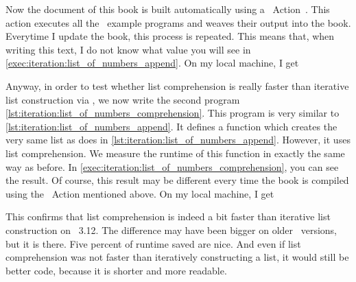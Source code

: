 Now the  document of this book is built automatically using a \github~Action~\cite{C2024GA}.
This action executes all the \python\ example programs and weaves their output into the book.
Everytime I update the book, this process is repeated.
This means that, when writing this text, I do not know what value you will see in \cref{exec:iteration:list_of_numbers_append}.
On my local machine, I get 

Anyway, in order to test whether list comprehension is really faster than iterative list construction via , we now write the second program \cref{lst:iteration:list_of_numbers_comprehension}.
This program is very similar to \cref{lst:iteration:list_of_numbers_append}.
It defines a function  which creates the very same list as  does in \cref{lst:iteration:list_of_numbers_append}.
However, it uses list comprehension.
We measure the runtime of this function in exactly the same way as before.
In \cref{exec:iteration:list_of_numbers_comprehension}, you can see the result.
Of course, this result may be different every time the book is compiled using the \github~Action mentioned above.
On my local machine, I get 

This confirms that list comprehension is indeed a bit faster than iterative list construction on \python~3.12.
The difference may have been bigger on older \python\ versions, but it is there.
Five percent of runtime saved are nice.
And even if list comprehension was not faster than iteratively constructing a list, it would still be better code, because it is shorter and more readable.

